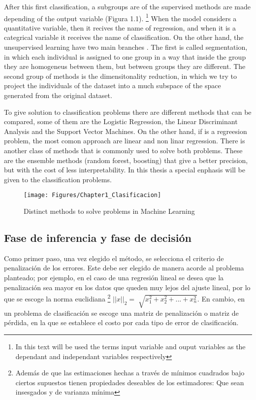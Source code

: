 After this first classification, a subgroups are of the supervised methods are made depending of the output variable (Figura 1.1). \footnote{In this text will be used the terms input variable and ouput variables as the  dependant and independant variables respectively} When the model considers a quantitative variable, then it recives the name of regression, and when it is a categrical variable it receives the name of classification. On the other hand, the unsupervised learning have two main branches \cite{hastie2009elements}. The first is called segmentation, in which each individual is assigned to one group in a way that inside the group they are homogeneus between them, but between groups they are different. The second group of methods is the dimensitonality reduction, in which we try to project the individuals of the dataset into a much subspace of the space generated from the original dataset.

To give solution to classification problems there are different methods that can be compared, some of them are the Logistic Regression, the Linear Discriminant Analysis and the Support Vector Machines. On the other hand, if is a regreesion problem, the most comon approach are linear and non linar regression. There is another class of methods that is commonly used to solve both problems. These are the ensemble methods (random forest, boosting) that give a better precision, but with the cost of less interpretability. In this thesis a special enphasis will be given to the classification problems. 

\begin{figure}[!ht]
  \centering
	\texttt{[image: Figures/Chapter1\_Clasificacion]}	
  \caption[Types of learning and the most common methods]
  {Distinct methods to solve problems in Machine Learning}
\end{figure}

\subsection{Fase de inferencia y fase de decisión}

Como primer paso, una vez elegido el método, se selecciona el criterio de penalización de los errores. Este debe ser elegido de manera acorde al problema planteado; por ejemplo, en el caso de una regresión lineal se desea que la penalización sea mayor en los datos que queden muy lejos del ajuste lineal, por lo que se escoge la norma euclidiana \footnote{Además de que las estimaciones hechas a través de mínimos cuadrados bajo ciertos supuestos tienen propiedades deseables de los estimadores: Que sean insesgados y de varianza mínima} $||x||_2 = \sqrt[]{x_{1}^{2}+x_{2}^{2}+ ... + x_{n}^{2}}$. En cambio, en un problema de clasificación se escoge una matriz de penalización o matriz de pérdida, en la que se establece el costo por cada tipo de error de clasificación.

